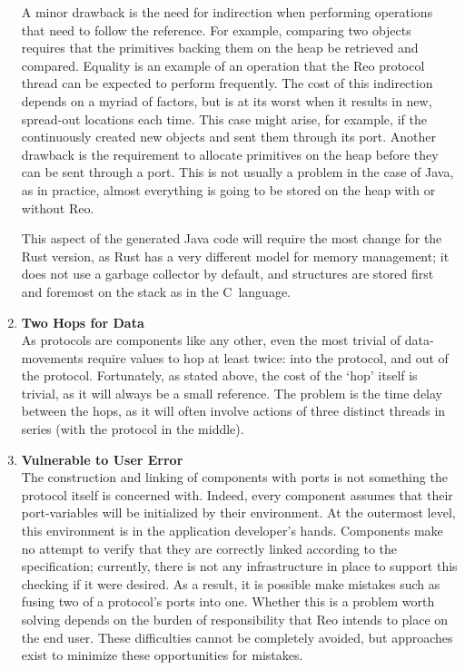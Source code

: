 \begin{enumerate}
	A minor drawback is the need for indirection when performing operations that need to follow the reference. For example, comparing two  objects requires that the  primitives backing them on the heap be retrieved and compared. Equality is an example of an operation that the Reo protocol thread can be expected to perform frequently. The cost of this indirection depends on a myriad of factors, but is at its worst when it results in new, spread-out locations each time. This case might arise, for example, if the  continuously created new  objects and sent them through its port. Another drawback is the requirement to allocate primitives on the heap before they can be sent through a port. This is not usually a problem in the case of Java, as in practice, almost everything is going to be stored on the heap with or without Reo.
	
	This aspect of the generated Java code will require the most change for the Rust version, as Rust has a very different model for memory management; it does not use a garbage collector by default, and structures are stored first and foremost on the stack as in the C~language.
	
	\item \textbf{Two Hops for Data}\\
	As protocols are components like any other, even the most trivial of data-movements require values to hop at least twice: into the protocol, and out of the protocol. Fortunately, as stated above, the cost of the `hop' itself is trivial, as it will always be a small reference. The problem is the time delay between the hops, as it will often involve actions of three distinct threads in series (with the protocol in the middle). 
	
	\item \textbf{Vulnerable to User Error}\\
	The construction and linking of components with ports is not something the protocol itself is concerned with. Indeed, every component assumes that their port-variables will be initialized by their environment. At the outermost level, this environment is in the application developer's hands. Components make no attempt to verify that they are correctly linked according to the specification; currently, there is not any infrastructure in place to support this checking if it were desired. As a result, it is possible make mistakes such as fusing two of a protocol's ports into one. Whether this is a problem worth solving depends on the burden of responsibility that Reo intends to place on the end user. These difficulties cannot be completely avoided, but approaches exist to minimize these opportunities for mistakes.
	

\end{enumerate}
